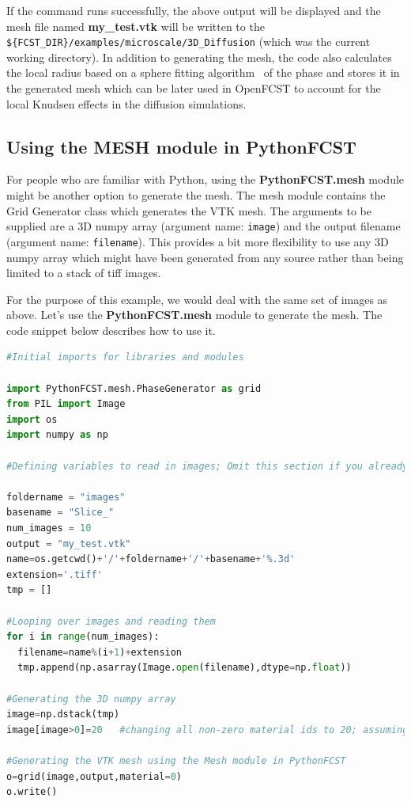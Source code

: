 If the command runs successfully, the above output will be displayed and the mesh file named \textbf{my\_test.vtk} will be written to the \verb!${FCST_DIR}/examples/microscale/3D_Diffusion! (which was the current working directory). In addition to generating the mesh, the code also calculates the local radius based on a sphere fitting algorithm~\cite{Sabharwal2016analysis} of the phase and stores it in the generated mesh which can be later used in OpenFCST to account for the local Knudsen effects in the diffusion simulations.

\subsection{Using the MESH module in PythonFCST}

For people who are familiar with Python, using the \textbf{PythonFCST.mesh} module might be another option to generate the mesh. The mesh module contains the Grid Generator class which generates the VTK mesh. The arguments to be supplied are a 3D numpy array (argument name: \verb!image!) and the output filename (argument name: \verb!filename!). This provides a bit more flexibility to use any 3D numpy array which might have been generated from any source rather than being limited to a stack of tiff images.

For the purpose of this example, we would deal with the same set of images as above. Let's use the \textbf{PythonFCST.mesh} module to generate the mesh. The code snippet below describes how to use it.

\begin{lstlisting}[language=Python]
#Initial imports for libraries and modules

import PythonFCST.mesh.PhaseGenerator as grid
from PIL import Image
import os
import numpy as np

#Defining variables to read in images; Omit this section if you already have a 3D array

foldername = "images"
basename = "Slice_"
num_images = 10
output = "my_test.vtk"
name=os.getcwd()+'/'+foldername+'/'+basename+'%.3d'
extension='.tiff'
tmp = []

#Looping over images and reading them
for i in range(num_images):
  filename=name%(i+1)+extension
  tmp.append(np.asarray(Image.open(filename),dtype=np.float))

#Generating the 3D numpy array
image=np.dstack(tmp)
image[image>0]=20   #changing all non-zero material ids to 20; assuming that pixel value of 0 was the one of interest

#Generating the VTK mesh using the Mesh module in PythonFCST
o=grid(image,output,material=0)
o.write()
\end{lstlisting}

